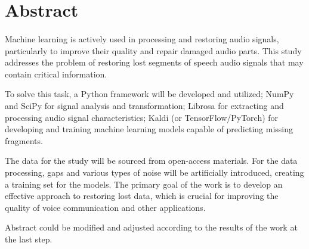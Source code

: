 
\section{Abstract}
\paragraph{}
    Machine learning is actively used in processing and restoring audio signals, particularly to improve their quality and
    repair damaged audio parts. This study addresses the problem of restoring lost segments of speech
    audio signals that may contain critical information.

    To solve this task, a Python framework will be developed and utilized; NumPy and SciPy for signal analysis and
    transformation; Librosa for extracting and processing audio signal characteristics; Kaldi (or TensorFlow/PyTorch)
    for developing and training machine learning models capable of predicting missing fragments.

    The data for the study will be sourced from open-access materials. For the data processing, gaps and
    various types of noise will be artificially introduced, creating a training set for the models.
    The primary goal of the work is to develop an effective approach to restoring lost data, which is crucial
    for improving the quality of voice communication and other applications.


{\color{red}Abstract could be modified and adjusted according to the results of the work at the last step.}
